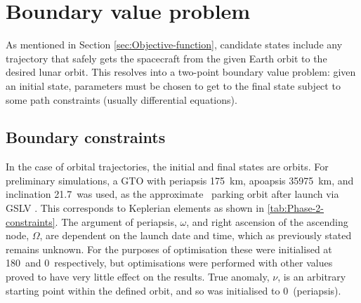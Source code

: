 



\section{Boundary value problem} \label{sec:BVP}

As mentioned in Section \ref{sec:Objective-function}, candidate states include any trajectory that safely gets the spacecraft from the given Earth orbit to the desired lunar orbit. This resolves into a two-point boundary value problem: given an initial state, parameters must be chosen to get to the final state subject to some path constraints (usually differential equations).


\subsection{Boundary constraints} \label{sub:Boundary-constraints}

In the case of orbital trajectories, the initial and final states are orbits. For preliminary simulations, a GTO with periapsis 175~km, apoapsis 35975~km, and inclination 21.7\degrees\ was used, as the approximate \BW\ parking orbit after launch via GSLV \parencite{GSLV}. This corresponds to Keplerian elements as shown in \autoref{tab:Phase-2-constraints}. The argument of periapsis, $\omega$, and right ascension of the ascending node, $\Omega$, are dependent on the launch date and time, which as previously stated remains unknown. For the purposes of optimisation these were initialised at 180\degrees\ and 0\degrees\ respectively, but optimisations were performed with other values proved to have very little effect on the results. True anomaly, $\nu$, is an arbitrary starting point within the defined orbit, and so was initialised to 0\degrees\ (periapsis).

